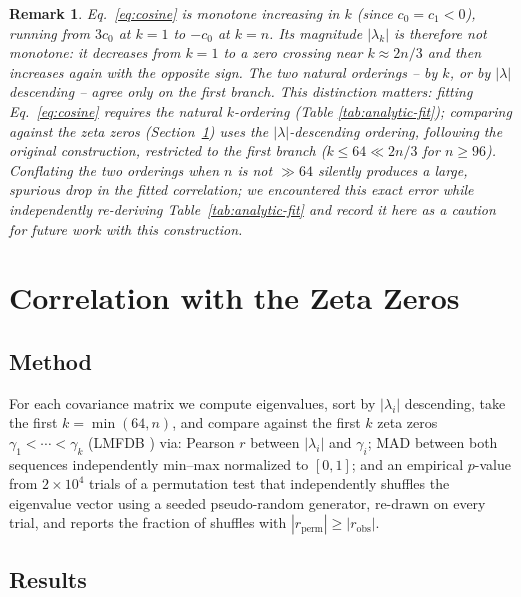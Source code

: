 \documentclass[11pt,a4paper]{article}
\newtheorem{remark}{Remark}
\begin{document}
\begin{remark}
\label{rem:ordering}
Eq.~\eqref{eq:cosine} is monotone increasing in $k$ (since $c_0=c_1<0$),
running from $3c_0$ at $k=1$ to $-c_0$ at $k=n$. Its \emph{magnitude}
$|\lambda_k|$ is therefore not monotone: it decreases from $k=1$ to a zero
crossing near $k \approx 2n/3$ and then increases again with the opposite
sign. The two natural orderings -- by $k$, or by $|\lambda|$ descending --
agree only on the first branch. This distinction matters: fitting
Eq.~\eqref{eq:cosine} requires the natural $k$-ordering (Table
\ref{tab:analytic-fit}); comparing against the zeta zeros
(Section~\ref{sec:correlation}) uses the $|\lambda|$-descending ordering,
following the original construction, restricted to the first branch
($k \le 64 \ll 2n/3$ for $n\ge 96$). Conflating the two orderings when
$n$ is not $\gg 64$ silently produces a large, spurious drop in the fitted
correlation; we encountered this exact error while independently
re-deriving Table~\ref{tab:analytic-fit} and record it here as a caution
for future work with this construction.
\end{remark}

\section{Correlation with the Zeta Zeros}
\label{sec:correlation}

\subsection{Method}

For each covariance matrix we compute eigenvalues, sort by $|\lambda_i|$
descending, take the first $k=\min(64,n)$, and compare against the first
$k$ zeta zeros $\gamma_1 < \cdots < \gamma_k$ (LMFDB \cite{lmfdb}) via:
Pearson $r$ between $|\lambda_i|$ and $\gamma_i$; MAD between both sequences
independently min--max normalized to $[0,1]$; and an empirical $p$-value
from $2\times10^4$ trials of a permutation test that independently shuffles
the eigenvalue vector using a seeded pseudo-random generator, re-drawn on
every trial, and reports the fraction of shuffles with $|r_{\mathrm{perm}}|
\ge |r_{\mathrm{obs}}|$.

\subsection{Results}
\end{document}

